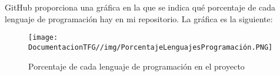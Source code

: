GitHub proporciona una gráfica en la que se indica qué porcentaje de cada lenguaje de programación hay en mi repositorio. La gráfica es la siguiente:

\begin{figure}[H]
    \centering
    \texttt{[image: DocumentacionTFG//img/PorcentajeLenguajesProgramación.PNG]}
    \caption{Porcentaje de cada lenguaje de programación en el proyecto}
    \label{fig:enter-label}
\end{figure}